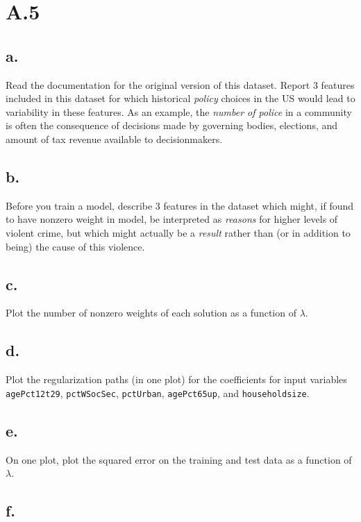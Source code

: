 \documentclass{article}
\newcommand{\1}{\mathbf{1}}
\begin{document}
\section*{A.5}
{\Large 

\subsection*{a.}

Read the documentation for the original
  version of this dataset. Report 3 features included in this dataset for which historical \emph{policy} choices in the US would lead to variability in these features. As an example, the \emph{number of police} in a community
  is often the consequence of decisions made by governing bodies, elections, and amount of tax revenue available to decisionmakers.

\subsection*{b.}

Before you train a model, describe 3 features in the dataset which might, if found to have nonzero weight in model, be interpreted as \emph{reasons} for higher levels of violent crime, but which might actually be a \emph{result} rather than (or in addition to being) the cause of this violence.

\subsection*{c.}

Plot the number of nonzero weights of each solution as a function of $\lambda$.

\subsection*{d.}

Plot the regularization paths (in one plot) for the coefficients for input variables \texttt{agePct12t29}, \texttt{pctWSocSec}, \texttt{pctUrban}, \texttt{agePct65up}, and \texttt{householdsize}.

\subsection*{e.}

On one plot, plot the squared error on the training and test data as a function of $\lambda$.

\subsection*{f.}

}
\end{document}
